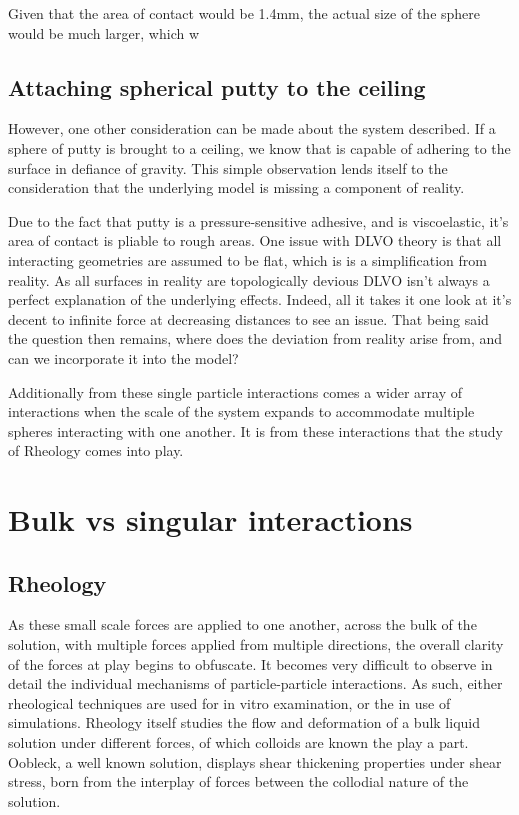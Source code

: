 Given that the area of contact would be 1.4mm, the actual size of the sphere would be much larger, which w


\subsection{Attaching spherical putty to the ceiling}

However, one other consideration can be made about the system described. If a sphere of putty is brought to a ceiling, we know that is capable of adhering to the surface in defiance of gravity. This simple observation lends itself to the consideration that the underlying model is missing a component of reality.

Due to the fact that putty is a pressure-sensitive adhesive, and is viscoelastic, it's area of contact is pliable to rough areas. One issue with DLVO theory is that all interacting geometries are assumed to be flat, which is is a simplification from reality. As all surfaces in reality are topologically devious DLVO isn't always a perfect explanation of the underlying effects. Indeed, all it takes it one look at it's decent to infinite force at decreasing distances to see an issue. That being said the question then remains, where does the deviation from reality arise from, and can we incorporate it into the model?

Additionally from these single particle interactions comes a wider array of interactions when the scale of the system expands to accommodate multiple spheres interacting with one another. It is from these interactions that the study of Rheology comes into play. 

\newpage

\section{Bulk vs singular interactions}
\subsection{Rheology}

 As these small scale forces are applied to one another, across the bulk of the solution, with multiple forces applied from multiple directions, the overall clarity of the forces at play begins to obfuscate. It becomes very difficult to observe in detail the individual mechanisms of particle-particle interactions. As such, either rheological techniques are used for in vitro examination, or the in use of simulations. Rheology itself studies the flow and deformation of a bulk liquid solution under different forces, of which colloids are known the play a part. Oobleck, a well known solution, displays shear thickening properties under shear stress, born from the interplay of forces between the collodial nature of the solution.
 
